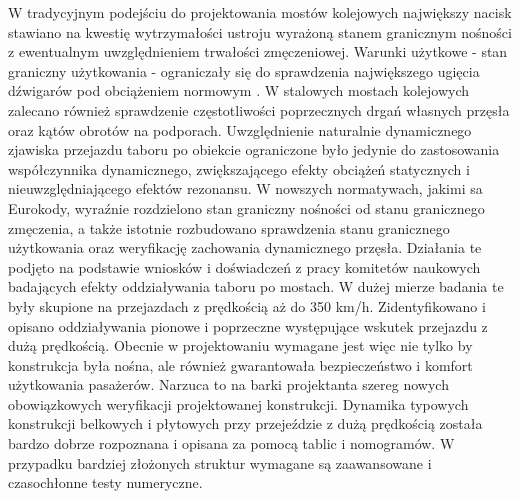 W tradycyjnym podejściu do projektowania mostów kolejowych największy nacisk stawiano na kwestię wytrzymałości ustroju wyrażoną stanem granicznym nośności z ewentualnym uwzględnieniem trwałości zmęczeniowej. Warunki użytkowe - stan graniczny użytkowania - ograniczały się do sprawdzenia największego ugięcia dźwigarów pod obciążeniem normowym \parencite{PKNf}. W stalowych mostach kolejowych zalecano również sprawdzenie częstotliwości poprzecznych drgań własnych przęsła oraz kątów obrotów na podporach. Uwzględnienie naturalnie dynamicznego zjawiska przejazdu taboru po obiekcie ograniczone było jedynie do zastosowania współczynnika dynamicznego, zwiększającego efekty obciążeń statycznych i nieuwzględniającego efektów rezonansu. 
W nowszych normatywach, jakimi sa Eurokody, wyraźnie rozdzielono stan graniczny nośności od stanu granicznego zmęczenia, a także istotnie rozbudowano sprawdzenia stanu granicznego użytkowania oraz weryfikację zachowania dynamicznego przęsła. Działania te podjęto na podstawie wniosków i doświadczeń z pracy komitetów naukowych badających efekty oddziaływania taboru po mostach. W dużej mierze badania te były skupione na przejazdach z prędkością aż do 350 km/h. Zidentyfikowano i opisano oddziaływania pionowe i poprzeczne występujące wskutek przejazdu z dużą prędkością. Obecnie w projektowaniu wymagane jest więc nie tylko by konstrukcja była nośna, ale również gwarantowała bezpieczeństwo i komfort użytkowania pasażerów. Narzuca to na barki projektanta szereg nowych obowiązkowych weryfikacji projektowanej konstrukcji. Dynamika typowych konstrukcji belkowych i płytowych przy przejeździe z dużą prędkością została bardzo dobrze rozpoznana i opisana za pomocą tablic i nomogramów. W przypadku bardziej złożonych struktur wymagane są zaawansowane i czasochłonne testy numeryczne. 

